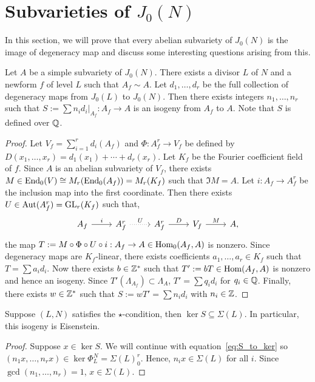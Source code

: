 \documentclass[11pt, proquest]{uwthesis}
\begin{document}
\section{Subvarieties of $J_0(N)$}%
\label{sec:subvarieties_of_j_0_n_}

In this section, we will prove that every abelian subvariety of $J_0(N)$ is the
image of degeneracy map and discuss some interesting questions arising from
this.

\begin{proposition}
    \label{prop:integral_degen}
    Let $A$ be a simple subvariety of $J_0(N)$. There exists a divisor $L$ of
    $N$ and a newform $f$ of level $L$ such that $A_f \sim A$. Let
    $d_1,\ldots,d_r$ be the full collection of degeneracy maps from $J_0(L)$ to
    $J_0(N)$. Then there exists integers $n_1,\ldots,n_r$ such that $S:=\sum
    n_i d_i|_{A_f}: A_f\to A$ is an isogeny from $A_f$ to $A$. Note that $S$ is
    defined over $\mathbb{Q}$.
\end{proposition}
\begin{proof}
    Let $V_f=\sum_{i=1} ^r d_i(A_f)$ and $\Phi:A_f ^r \to V_f$ be defined by
    $D(x_1,\ldots,x_r) = d_1(x_1)+\cdots+d_r(x_r)$. Let $K_f$ be the Fourier
    coefficient field of $f$. Since $A$ is an abelian subvariety of $V_f$, there
    exists $M\in \operatorname{End}_0(V)\cong M_r(\operatorname{End}_0(A_f)) = M_r (K_f)$ such that $\Im M
    = A$. Let $i:A_f\to A_f ^r$ be the inclusion map into the first coordinate.
    Then there exists $U\in \operatorname{Aut}(A_f ^r)=\operatorname{GL}_r (K_f)$ such that,
    \[
        \begin{tikzcd}
            A_f \arrow[r,"i"] &
            A_f ^r \arrow[r, dotted, "U"] &
            A_f ^r \arrow[r, "D"] &
            V_f \arrow[r, "M"] &
            A,
        \end{tikzcd}
    \]
    the map $T:=M \circ \Phi \circ U\circ i:A_f\to A\in \operatorname{Hom}_0(A_f, A)$ is
    nonzero. Since degeneracy maps are $K_f$-linear, there exists coefficients
    $a_1,\ldots,a_r\in K_f$ such that $T = \sum a_i d_i$. Now there exists
    $b\in \mathbb{Z}^*$ such that $T':=bT\in \operatorname{Hom}(A_f, A)$ is nonzero and hence an
    isogeny. Since $T'(\Lambda_{A_f})\subset \Lambda_A$, $T'=\sum q_i d_i$
    for $q_i\in \mathbb{Q}$. Finally, there exists $w\in \mathbb{Z}^*$ such that
    $S:=wT'=\sum n_i d_i$ with $n_i\in \mathbb{Z}$.
\end{proof}


\begin{proposition}
    \label{prop:star_eisenstein}
    Suppose $(L, N)$ satisfies the $\star$-condition, then $\ker S\subseteq
    \Sigma(L)$. In particular, this isogeny is Eisenstein.
\end{proposition}
\begin{proof}
    Suppose $x\in \ker S$. We will continue with equation~\eqref{eq:S_to_ker}
    so $(n_1 x, \ldots, n_r x)\in \ker\Phi_L ^N = \Sigma(L)_0 ^r$. Hence, $n_i x\in
    \Sigma(L)$ for all $i$. Since $\gcd(n_1,\ldots,n_r)=1$, $x\in \Sigma(L)$.
\end{proof}
\end{document}
